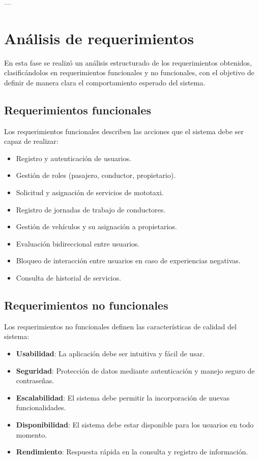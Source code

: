 ---

\section{Análisis de requerimientos}

En esta fase se realizó un análisis estructurado de los requerimientos obtenidos, clasificándolos en requerimientos funcionales y no funcionales, con el objetivo de definir de manera clara el comportamiento esperado del sistema.

\subsection*{Requerimientos funcionales}

Los requerimientos funcionales describen las acciones que el sistema debe ser capaz de realizar:

\begin{itemize}
    \item Registro y autenticación de usuarios.
    \item Gestión de roles (pasajero, conductor, propietario).
    \item Solicitud y asignación de servicios de mototaxi.
    \item Registro de jornadas de trabajo de conductores.
    \item Gestión de vehículos y su asignación a propietarios.
    \item Evaluación bidireccional entre usuarios.
    \item Bloqueo de interacción entre usuarios en caso de experiencias negativas.
    \item Consulta de historial de servicios.
\end{itemize}

\subsection*{Requerimientos no funcionales}

Los requerimientos no funcionales definen las características de calidad del sistema:

\begin{itemize}
    \item \textbf{Usabilidad}: La aplicación debe ser intuitiva y fácil de usar.
    \item \textbf{Seguridad}: Protección de datos mediante autenticación y manejo seguro de contraseñas.
    \item \textbf{Escalabilidad}: El sistema debe permitir la incorporación de nuevas funcionalidades.
    \item \textbf{Disponibilidad}: El sistema debe estar disponible para los usuarios en todo momento.
    \item \textbf{Rendimiento}: Respuesta rápida en la consulta y registro de información.
\end{itemize}

